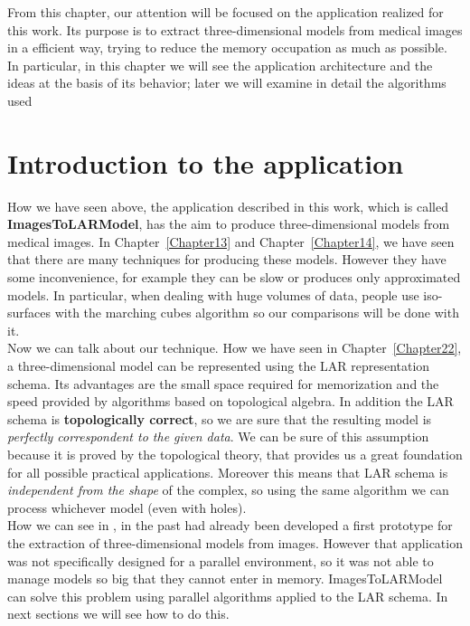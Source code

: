 From this chapter, our attention will be focused on the application realized for this work. Its purpose is to extract three-dimensional models from medical images in a efficient way, trying to reduce the memory occupation as much as possible. In particular, in this chapter we will see the application architecture and the ideas at the basis of its behavior; later we will examine in detail the algorithms used

\section{Introduction to the application}\label{sec31:introduction}

How we have seen above, the application described in this work, which is called \textbf{ImagesToLARModel}, has the aim to produce three-dimensional models from medical images. In Chapter~\ref{Chapter13} and Chapter~\ref{Chapter14}, we have seen that there are many techniques for producing these models. However they have some inconvenience, for example they can be slow or produces only approximated models. In particular, when dealing with huge volumes of data, people use iso-surfaces with the marching cubes algorithm so our comparisons will be done with it.\\

Now we can talk about our technique. How we have seen in Chapter~\ref{Chapter22}, a three-dimensional model can be represented using the LAR representation schema. Its advantages are the small space required for memorization and the speed provided by algorithms based on topological algebra. In addition the LAR schema is \textbf{topologically correct}, so we are sure that the resulting model is \textit{perfectly correspondent to the given data}. We can be sure of this assumption because it is proved by the topological theory, that provides us a great foundation for all possible practical applications. Moreover this means that LAR schema is \textit{independent from the shape} of the complex, so using the same algorithm we can process whichever model (even with holes).\\

How we can see in \cite{Paoluzzi}, in the past had already been developed a first prototype for the extraction of three-dimensional models from images. However that application was not specifically designed for a parallel environment, so it was not able to manage models so big that they cannot enter in memory. ImagesToLARModel can solve this problem using parallel algorithms applied to the LAR schema. In next sections we will see how to do this.

